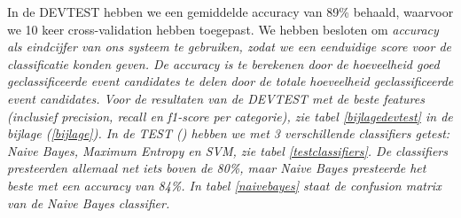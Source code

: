 {{In de DEVTEST hebben we een gemiddelde accuracy van 89\% behaald, waarvoor we 10 keer cross-validation hebben toegepast. We hebben besloten om \it{accuracy} als
eindcijfer van ons systeem te gebruiken, zodat we een eenduidige score voor de classificatie konden geven. De accuracy is te berekenen
door de hoeveelheid goed geclassificeerde event candidates te delen door de totale hoeveelheid geclassificeerde event candidates. Voor de resultaten van de DEVTEST met de beste 
features (inclusief \it{precision}, \it{recall} en \it{f1-score} per categorie), zie tabel \ref{bijlagedevtest} in de bijlage (\ref{bijlage}). 
\vl
In de TEST () hebben we met 3 verschillende classifiers getest: \it{Naive Bayes}, \it{Maximum Entropy} en
\it{SVM}, zie tabel \ref{testclassifiers}. De classifiers presteerden allemaal net iets boven de 80\%, maar Naive Bayes
presteerde het beste met een accuracy van 84\%. In tabel \ref{naivebayes} staat de confusion matrix van de Naive Bayes classifier.

}}
